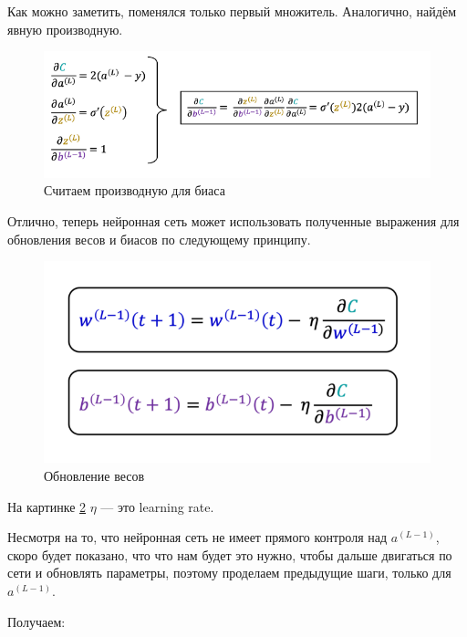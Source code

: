 \documentclass[a4paper, 10pt, openany]{book} %
\begin{document}
	Как можно заметить, поменялся только первый множитель. Аналогично, найдём явную производную.
	
	\begin{figure}[h!]
		\centering
		\includegraphics[width=\linewidth]{pictures/backpropagation/derivative_itself_bias.png}
		\caption{Считаем производную для биаса}
		\label{derivative_itself_bias}
	\end{figure}
	
	Отлично, теперь нейронная сеть может использовать полученные выражения для обновления весов и биасов по следующему принципу.
	
	\begin{figure}[h!]
		\centering
		\includegraphics[width=\linewidth]{pictures/backpropagation/updating.png}
		\caption{Обновление весов}
		\label{updating}
	\end{figure}
	
	На картинке \ref{updating} $\eta$ --- это learning rate.
	
	Несмотря на то, что нейронная сеть не имеет прямого контроля над $a^{(L-1)}$, скоро будет показано, что что нам будет это нужно, чтобы дальше двигаться по сети и обновлять параметры, поэтому проделаем предыдущие шаги, только для $a^{(L-1)}$.
	
	Получаем:
	
\end{document}
